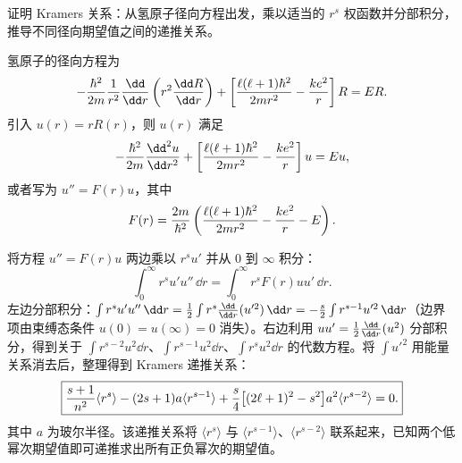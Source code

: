 \begin{question}
证明 Kramers 关系：从氢原子径向方程出发，乘以适当的 $r^s$ 权函数并分部积分，推导不同径向期望值之间的递推关系。
\end{question}
\begin{solution}
氢原子的径向方程为
\[
-{\hbar^2\over2m}{1\over r^2}{\dd\over\dd r}\left(r^2{\dd R\over\dd r}\right)
+ \left[{\ell(\ell+1)\hbar^2\over2mr^2} - {ke^2\over r}\right]R = E R.
\]
引入 $u(r)=rR(r)$，则 $u(r)$ 满足
\[
-{\hbar^2\over2m}{\dd^2 u\over\dd r^2} + \left[{\ell(\ell+1)\hbar^2\over2mr^2} - {ke^2\over r}\right]u = E u,
\]
或者写为 $u'' = F(r)u$，其中
\[
F(r) = {2m\over\hbar^2}\left({\ell(\ell+1)\hbar^2\over2mr^2} - {ke^2\over r} - E\right).
\]

将方程 $u'' = F(r)u$ 两边乘以 $r^s u'$ 并从 $0$ 到 $\infty$ 积分：
\[
\int_0^\infty r^s u' u''\,\dd r = \int_0^\infty r^s F(r) u u'\,\dd r.
\]
左边分部积分：$\int r^s u' u''\,\dd r = {1\over2}\int r^s {\dd\over\dd r}(u'^2)\,\dd r = -{s\over2}\int r^{s-1} u'^2\,\dd r$（边界项由束缚态条件 $u(0)=u(\infty)=0$ 消失）。右边利用 $u u' = {1\over2}{\dd\over\dd r}(u^2)$ 分部积分，得到关于 $\int r^{s-2}u^2\dd r$、$\int r^{s-1}u^2\dd r$、$\int r^{s}u^2\dd r$ 的代数方程。将 $\int u'^2$ 用能量关系消去后，整理得到 Kramers 递推关系：
\[
\boxed{{s+1\over n^2}\langle r^s\rangle - (2s+1)a\langle r^{s-1}\rangle + {s\over4}\bigl[(2\ell+1)^2-s^2\bigr]a^2\langle r^{s-2}\rangle = 0.}
\]
其中 $a$ 为玻尔半径。该递推关系将 $\langle r^s\rangle$ 与 $\langle r^{s-1}\rangle$、$\langle r^{s-2}\rangle$ 联系起来，已知两个低幂次期望值即可递推求出所有正负幂次的期望值。
\end{solution}


